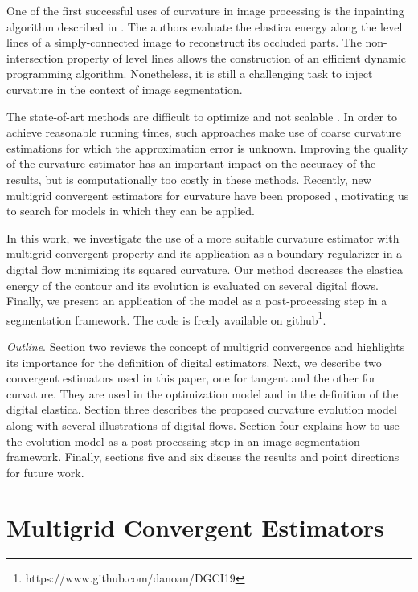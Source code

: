 \documentclass[runningheads]{llncs}
\begin{document}
One of the first successful uses of curvature in image processing is the inpainting algorithm described in
\cite{masnou98}. The authors evaluate the elastica energy along the level lines of a simply-connected image to
reconstruct its occluded parts. The non-intersection property of level lines allows the construction of an efficient
dynamic programming algorithm. Nonetheless, it is still a challenging task to inject curvature in the context of image
segmentation.

The state-of-art methods are difficult to optimize and not scalable \cite{zehiry10,schoenemann09,nieuwenhuis14}. In
order to achieve reasonable running times, such approaches make use of coarse curvature estimations for which the approximation
error is unknown. Improving the quality of the curvature estimator has an important impact on the accuracy of the
results, but is computationally too costly in these methods. Recently, new multigrid convergent estimators for curvature
have been proposed \cite{schindele17,coeurjolly13,roussillon11}, motivating us to search for models in which they can be
applied.

In this work, we investigate the use of a more suitable curvature estimator with multigrid convergent property and its
application as a boundary regularizer in a digital flow minimizing its squared curvature. Our method decreases the
elastica energy of the contour and its evolution is evaluated on several digital flows. Finally, we present an
application of the model as a post-processing step in a segmentation framework. The code is freely available on
github\footnote{https://www.github.com/danoan/DGCI19}.

\textit{Outline}. Section two reviews the concept of multigrid convergence and highlights its importance for the
definition of digital estimators. Next, we describe two convergent estimators used in this paper, one for tangent and
the other for curvature. They are used in the optimization model and in the definition of the digital elastica. Section
three describes the proposed curvature evolution model along with several illustrations of digital flows. Section four
explains how to use the evolution model as a post-processing step in an image segmentation framework. Finally, sections
five and six discuss the results and point directions for future work.




\section{Multigrid Convergent Estimators}
\end{document}
